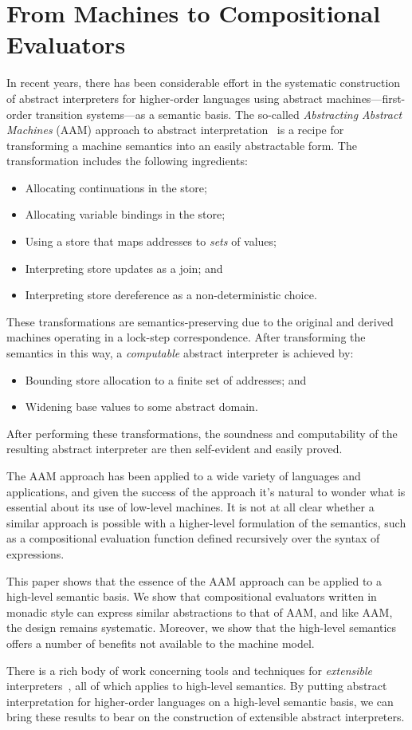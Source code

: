 \section{From Machines to Compositional Evaluators}
\label{s:aam}

In recent years, there has been considerable effort in the systematic
construction of abstract interpreters for higher-order languages using abstract
machines---first-order transition systems---as a semantic basis.  The so-called
\emph{Abstracting Abstract Machines} (AAM) approach to abstract
interpretation~\cite{dvanhorn:VanHorn2010Abstracting} is a recipe for
transforming a machine semantics into an easily abstractable form. The
transformation includes the following ingredients:
\begin{itemize}
\item Allocating continuations in the store;
\item Allocating variable bindings in the store;
\item Using a store that maps addresses to \emph{sets} of values;
\item Interpreting store updates as a join; and
\item Interpreting store dereference as a non-deterministic choice.
\end{itemize}
These transformations are semantics-preserving due to the original and derived
machines operating in a lock-step correspondence.  After transforming the
semantics in this way, a \emph{computable} abstract interpreter is achieved by:
\begin{itemize}
\item Bounding store allocation to a finite set of addresses; and
\item Widening base values to some abstract domain.
\end{itemize}
After performing these transformations, the soundness and computability of the
resulting abstract interpreter are then self-evident and easily proved.

The AAM approach has been applied to a wide variety of languages and
applications, and given the success of the approach it's natural to wonder what
is essential about its use of low-level machines. It is not at all clear
whether a similar approach is possible with a higher-level formulation of the
semantics, such as a compositional evaluation function defined recursively over
the syntax of expressions.

This paper shows that the essence of the AAM approach can be applied to a
high-level semantic basis.  We show that compositional evaluators written in
monadic style can express similar abstractions to that of AAM, and like AAM,
the design remains systematic.  Moreover, we show that the high-level semantics
offers a number of benefits not available to the machine model.  

There is a rich body of work concerning tools and techniques for
\emph{extensible} interpreters~\cite{dvanhorn:Liang1995Monad,
  local:jaskelioff2009lifting, local:kiselyov2012typed}, all of which
applies to high-level semantics.  By putting abstract interpretation
for higher-order languages on a high-level semantic basis, we can
bring these results to bear on the construction of extensible abstract
interpreters.
